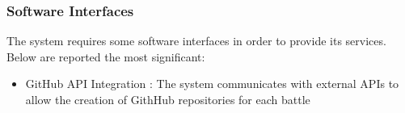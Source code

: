 \subsubsection{Software Interfaces}
The system requires some software interfaces in order to provide its services. Below are reported the most significant:
\begin{itemize}
    \item GitHub API Integration : The system communicates with external APIs to allow the creation of GithHub repositories for each battle
\end{itemize}